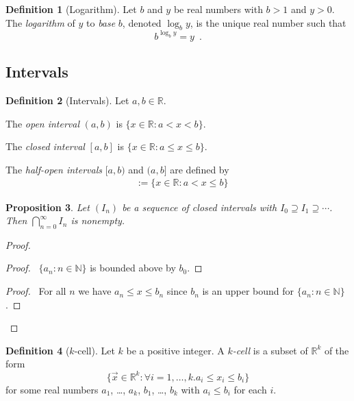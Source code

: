 \documentclass{book}
\let\qed\relax
\newtheorem{prop}{Proposition}[chapter]
\theoremstyle{definition}
\newtheorem{df}[prop]{Definition}
\begin{document}
\begin{df}[Logarithm]
Let $b$ and $y$ be real numbers with $b > 1$ and $y > 0$. The \emph{logarithm} of $y$ to \emph{base} $b$, denoted $\log_b y$, is the unique real number such that
\[ b^{\log_b y} = y \enspace . \]
\end{df}

\subsection{Intervals}

\begin{df}[Intervals]
Let $a, b \in \mathbb{R}$. 

The \emph{open interval} $(a,b)$ is $\{ x \in \mathbb{R} : a < x < b \}$.

The \emph{closed interval} $[a,b]$ is $\{ x \in \mathbb{R} : a \leq x \leq b \}$.

The \emph{half-open intervals} $[a,b)$ and $(a,b]$ are defined by
\begin{align*}
[a,b) & := \{ x \in \mathbb{R} : a \leq x < b \} \\
(a,b] & := \{ x \in \mathbb{R} : a < x \leq b \}
\end{align*}
\end{df}

\begin{prop}
Let $(I_n)$ be a sequence of closed intervals with $I_0 \supseteq I_1 \supseteq \cdots$. Then $\bigcap_{n=0}^\infty I_n$ is nonempty.
\end{prop}

\begin{proof}
\pf
{}
\begin{proof}
	\pf\ $\{ a_n : n \in \mathbb{N} \}$ is bounded above by $b_0$.
\end{proof}
\begin{proof}
	\pf\ For all $n$ we have $a_n \leq x \leq b_n$ since $b_n$ is an upper bound for $\{ a_n : n \in \mathbb{N} \}$.
\end{proof}
\qed
\end{proof}

\begin{df}[$k$-cell]
Let $k$ be a positive integer. A \emph{$k$-cell} is a subset of $\mathbb{R}^k$ of the form
\[ \{ \vec{x} \in \mathbb{R}^k : \forall i = 1, \ldots, k. a_i \leq x_i \leq b_i \} \]
for some real numbers $a_1$, \ldots, $a_k$, $b_1$, \ldots, $b_k$ with $a_i \leq b_i$ for each $i$.
\end{df}
\end{document}
